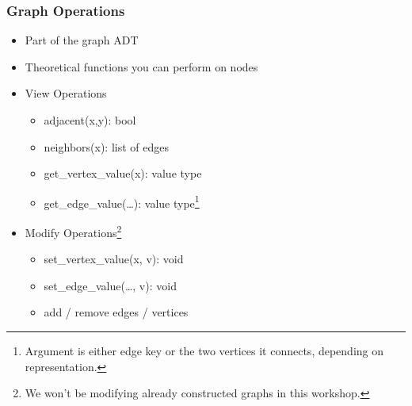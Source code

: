 \documentclass[aspectratio=169]{beamer}
\begin{document}
\begin{frame}
    \frametitle{Graph Operations}
    \begin{itemize}
        \item Part of the graph ADT
        \item Theoretical functions you can perform on nodes
        \pause
        \item View Operations
        \begin{itemize}
            \item adjacent(x,y): bool
            \item neighbors(x): list of edges
            \item get\_vertex\_value(x): value type
            \item get\_edge\_value(\dots): value type\footnote[frame]{Argument is either edge key or the two vertices it connects, depending on representation.}
        \end{itemize}
        \pause
        \item Modify Operations\footnote[frame]{We won't be modifying already constructed graphs in this workshop.}
        \begin{itemize}
            \item set\_vertex\_value(x, v): void
            \item set\_edge\_value(\dots, v): void
            \item add / remove edges / vertices
        \end{itemize}
    \end{itemize}
\end{frame}
\end{document}

